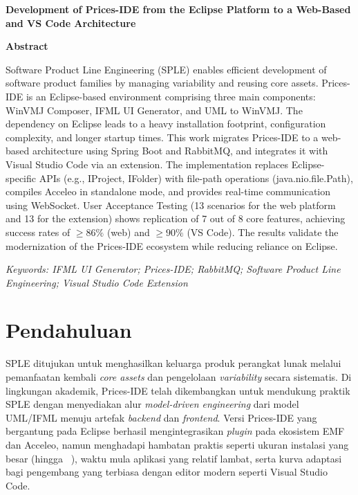 \documentclass[12pt,a4paper,onecolumn]{article}
\newcommand{\f}[1]{\textit{#1}}
\def\judulInggris{Development of Prices-IDE from the Eclipse Platform to a Web-Based and VS Code Architecture}
\begin{document}
\vspace*{2\baselineskip}
{\begin{center}\textbf{\fontsize{12}{14}\selectfont \judulInggris}\end{center}}
\vspace{12pt}
{\begin{center}\textbf{\fontsize{12}{14}\selectfont Abstract}\end{center}}
\vspace{12pt}
{\fontsize{10}{12}\selectfont
\singlespacing
Software Product Line Engineering (SPLE) enables efficient development of software product families by managing variability and reusing core assets. Prices-IDE is an Eclipse-based environment comprising three main components: WinVMJ Composer, IFML UI Generator, and UML to WinVMJ. The dependency on Eclipse leads to a heavy installation footprint, configuration complexity, and longer startup times. This work migrates Prices-IDE to a web-based architecture using Spring Boot and RabbitMQ, and integrates it with Visual Studio Code via an extension. The implementation replaces Eclipse-specific APIs (e.g., IProject, IFolder) with file-path operations (java.nio.file.Path), compiles Acceleo in standalone mode, and provides real-time communication using WebSocket. User Acceptance Testing (13 scenarios for the web platform and 13 for the extension) shows replication of 7 out of 8 core features, achieving success rates of $\geq 86\%$ (web) and $\geq 90\%$ (VS Code). The results validate the modernization of the Prices-IDE ecosystem while reducing reliance on Eclipse.\par}

\vspace{12pt}
{\fontsize{10}{12}\selectfont\itshape
Keywords: IFML UI Generator; Prices-IDE; RabbitMQ; Software Product Line Engineering; Visual Studio Code Extension\par}

\vspace*{3\baselineskip}
\section*{Pendahuluan}
SPLE ditujukan untuk menghasilkan keluarga produk perangkat lunak melalui pemanfaatan kembali \f{core assets} dan pengelolaan \f{variability} secara sistematis. Di lingkungan akademik, Prices-IDE telah dikembangkan untuk mendukung praktik SPLE dengan menyediakan alur \f{model-driven engineering} dari model UML/IFML menuju artefak \textit{backend} dan \textit{frontend}. Versi Prices-IDE yang bergantung pada Eclipse berhasil mengintegrasikan \textit{plugin} pada ekosistem EMF dan Acceleo, namun menghadapi hambatan praktis seperti ukuran instalasi yang besar (hingga \si{\giga\byte}), waktu mula aplikasi yang relatif lambat, serta kurva adaptasi bagi pengembang yang terbiasa dengan editor modern seperti Visual Studio Code.
\end{document}
